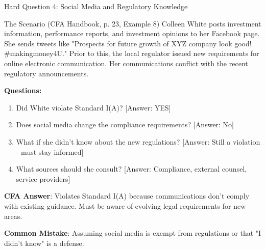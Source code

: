 \documentclass{beamer}
\begin{document}
	\begin{frame}{Hard Question 4: Social Media and Regulatory Knowledge}
		\begin{block}{The Scenario (CFA Handbook, p. 23, Example 8)}
			Colleen White posts investment information, performance reports, and investment opinions to her Facebook page. She sends tweets like "Prospects for future growth of XYZ company look good! \#makingmoney4U." Prior to this, the local regulator issued new requirements for online electronic communication. Her communications conflict with the recent regulatory announcements.
		\end{block}
		
		\vspace{0.2cm}
		\textbf{Questions:}
		\begin{enumerate}
			\item Did White violate Standard I(A)? \textcolor{cfared}{[Answer: YES]}
			\item Does social media change the compliance requirements? \textcolor{cfared}{[Answer: No]}
			\item What if she didn't know about the new regulations? \textcolor{cfared}{[Answer: Still a violation - must stay informed]}
			\item What sources should she consult? \textcolor{cfared}{[Answer: Compliance, external counsel, service providers]}
		\end{enumerate}
		
		\vspace{0.2cm}
		\textcolor{cfablue}{\textbf{CFA Answer}}: Violates Standard I(A) because communications don't comply with existing guidance. Must be aware of evolving legal requirements for new areas.
		
		\vspace{0.1cm}
		\textcolor{cfared}{\textbf{Common Mistake}}: Assuming social media is exempt from regulations or that "I didn't know" is a defense.
	\end{frame}
	
\end{document}
